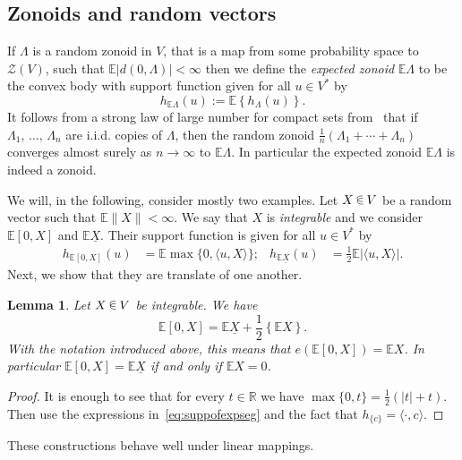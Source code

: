 \documentclass[10pt]{amsart}
\newtheorem{lemm}[theo]{Lemma}\newtheorem{prop}[theo]{Proposition}\newtheorem{coro}[theo]{Corollary}\newtheorem{conj}[theo]{Conjecture}
\theoremstyle{definition}\newtheorem{defi}[theo]{Definition}\newtheorem{rema}[theo]{Remark}\newtheorem{exam}[theo]{Example}\newtheorem{exem}[theo]{Example}\newtheorem{nota}[theo]{Notation}
\newcommand{\R}{\mathbb{R}}
\newcommand{\EE}{\mathbb{E}}
\newcommand{\ZZ}{\mathscr{Z}}
\newcommand{\seg}{\underline}
\newcommand*\randin{
\mathchoice {\raisebox{-.35ex}{$\displaystyle{^\subset}$}\mkern-11.5mu\raisebox{+.45ex}{$\displaystyle{_\subset}$}} {\mkern+1mu\raisebox{-.27ex}{$\textstyle{^\subset}$}\mkern-11.7mu\raisebox{+.45ex}{$\textstyle{_\subset}$}} {\raisebox{.35ex}{$\scriptstyle\subset$}\mkern-14mu\raisebox{-.15ex}{$\scriptstyle\subset$}} {\raisebox{.3ex}{$\scriptscriptstyle\subset$}\mkern-13.5mu\raisebox{-.10ex}{$\scriptscriptstyle\subset$}}}
\begin{document}
\subsection{Zonoids and random vectors}\label{sec:zonandrv}

If $\Lambda$ is a random zonoid in $V$, that is a map from some probability space to $\ZZ(V)$, such that $\EE |d(0,\Lambda)|<\infty$ then we define the \emph{expected zonoid} $\EE\Lambda$ to be the convex body with support function given for all $u\in V^*$ by
\begin{equation*}
h_{\EE\Lambda}(u):=\EE\left\{ h_\Lambda(u)\right\}.
\end{equation*}
It follows from a strong law of large number for compact sets from~\cite{ArsVit} that if $\Lambda_1,\,\ldots,\,\Lambda_n$ are i.i.d. copies of $\Lambda$, then the random zonoid $\tfrac{1}{n}(\Lambda_1+\cdots+\Lambda_n)$ converges almost surely as $n\to\infty$ to $\EE\Lambda$. In particular the expected zonoid $\EE\Lambda$ is indeed a zonoid.

We will, in the following, consider mostly two examples. Let $X\,\randin\, V$ be a random vector such that $\EE\|X\|<\infty$. We say that $X$ is \emph{integrable} and we consider $\EE[0,X]$ and $\EE\seg{X}$. Their support function is given for all $u\in V^*$ by
\begin{align}\label{eq:suppofexpseg}
h_{\EE[0,X]}(u)&=\EE\max\{0,\langle u, X\rangle\};& h_{\EE\seg{X}}(u)&=\frac{1}{2}\EE|\langle u, X\rangle|.
\end{align}
Next, we show that they are translate of one another.

\begin{lemm}\label{lem:centnotcent}
Let $X\,\randin\, V$ be integrable. We have
\begin{equation*}
\EE[0,X]=\EE\seg{X}+\frac{1}{2}\left\{\EE X\right\}.
\end{equation*}
With the notation introduced above, this means that $e(\EE[0,X])=\EE X$. In particular $\EE[0,X]=\EE\seg{X}$ if and only if $\EE X=0$.
\end{lemm}

\begin{proof}
It is enough to see that for every $t\in \R$ we have $\max\{0,t\}=\tfrac{1}{2}(|t|+t)$. Then use the expressions in~\eqref{eq:suppofexpseg} and the fact that $h_{\{c\}}=\langle\cdot,c\rangle$.
\end{proof}

These constructions behave well under linear mappings.
\end{document}

